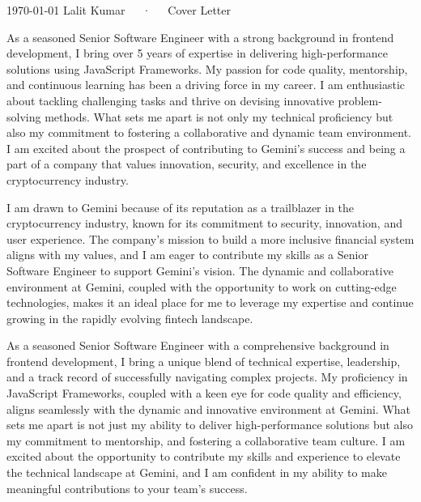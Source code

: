 \documentclass[11pt, a4paper]{awesome-cv}
\begin{document}
\makecvheader[R]

\makecvfooter
  {\today}
  {Lalit Kumar~~~·~~~Cover Letter}
  {}

\makelettertitle

\begin{cvletter}

As a seasoned Senior Software Engineer with a strong background in frontend development, I bring over 5 years of expertise in delivering high-performance solutions using JavaScript Frameworks. My passion for code quality, mentorship, and continuous learning has been a driving force in my career. I am enthusiastic about tackling challenging tasks and thrive on devising innovative problem-solving methods. What sets me apart is not only my technical proficiency but also my commitment to fostering a collaborative and dynamic team environment. I am excited about the prospect of contributing to Gemini's success and being a part of a company that values innovation, security, and excellence in the cryptocurrency industry.

I am drawn to Gemini because of its reputation as a trailblazer in the cryptocurrency industry, known for its commitment to security, innovation, and user experience. The company's mission to build a more inclusive financial system aligns with my values, and I am eager to contribute my skills as a Senior Software Engineer to support Gemini's vision. The dynamic and collaborative environment at Gemini, coupled with the opportunity to work on cutting-edge technologies, makes it an ideal place for me to leverage my expertise and continue growing in the rapidly evolving fintech landscape.

As a seasoned Senior Software Engineer with a comprehensive background in frontend development, I bring a unique blend of technical expertise, leadership, and a track record of successfully navigating complex projects. My proficiency in JavaScript Frameworks, coupled with a keen eye for code quality and efficiency, aligns seamlessly with the dynamic and innovative environment at Gemini. What sets me apart is not just my ability to deliver high-performance solutions but also my commitment to mentorship, and fostering a collaborative team culture. I am excited about the opportunity to contribute my skills and experience to elevate the technical landscape at Gemini, and I am confident in my ability to make meaningful contributions to your team's success.

\end{cvletter}


\makeletterclosing
\end{document}
